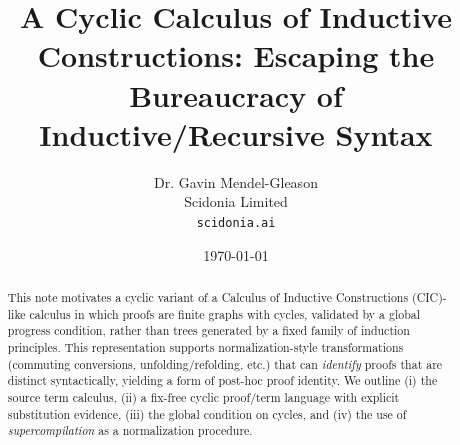 \documentclass[11pt]{article}
\title{A Cyclic Calculus of Inductive Constructions: Escaping the Bureaucracy of Inductive/Recursive Syntax}
\author{Dr. Gavin Mendel-Gleason\\Scidonia Limited\\\texttt{scidonia.ai}}
\date{\today}
\begin{document}
\maketitle

\begin{abstract}
This note motivates a cyclic variant of a Calculus of Inductive Constructions (CIC)-like calculus in which proofs are finite graphs with cycles, validated by a global progress condition, rather than trees generated by a fixed family of induction principles.
This representation supports normalization-style transformations (commuting conversions, unfolding/refolding, etc.) that can \emph{identify} proofs that are distinct syntactically, yielding a form of post-hoc proof identity.
We outline (i) the source term calculus, (ii) a fix-free cyclic proof/term language with explicit substitution evidence, (iii) the global condition on cycles, and (iv) the use of \emph{supercompilation} as a normalization procedure.
\end{abstract}

\tableofcontents
















\end{document}
